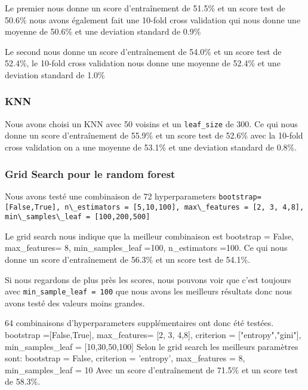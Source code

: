 Le premier nous donne un score d'entraînement de 51.5\% et un score test de 50.6\% nous avons également fait une 10-fold cross validation qui nous donne une moyenne de 50.6\% et une deviation standard de 0.9\%

Le second nous donne un score d'entraînement de 54.0\% et un score test de 52.4\%, le 10-fold cross validation nous donne une moyenne de 52.4\% et une deviation standard de 1.0\%

\subsubsection{KNN}
Nous avons choisi un KNN avec 50 voisins et un \lstinline!leaf_size! de 300. Ce qui nous donne un score d'entraînement de 55.9\% et un score test de 52.6\% avec la 10-fold cross validation on a une moyenne de 53.1\% et une deviation standard de 0.8\%.

\subsubsection{Grid Search pour le random forest}
Nous avons testé une combinaison de 72 hyperparameters \newline
\lstinline!bootstrap= [False,True], n\_estimators = [5,10,100], max\_features = [2, 3, 4,8], min\_samples\_leaf = [100,200,500]! \newline

Le grid search nous indique que la meilleur combinaison est bootstrap = False, max\_features= 8, min\_samples\_leaf =100, n\_estimators =100. \newline
Ce qui nous donne un score d'entraînement de 56.3\% et un score test de 54.1\%.

Si nous regardons de plus près les scores, nous pouvons voir que c'est toujours avec \lstinline!min_sample_leaf = 100! que nous avons les meilleurs résultats donc nous avons testé des valeurs moins grandes.

64 combinaisons d'hyperparameters supplémentaires ont donc été testées.\newline
bootstrap =[False,True], max\_features= [2, 3, 4,8], criterion = ["entropy","gini"], min\_samples\_leaf =  [10,30,50,100] \newline
Selon le grid search les meilleurs paramètres sont: bootstrap = False, criterion = 'entropy', max\_features = 8, min\_samples\_leaf = 10 \newline
Avec un score d'entraînement de 71.5\% et un score test de 58.3\%.

